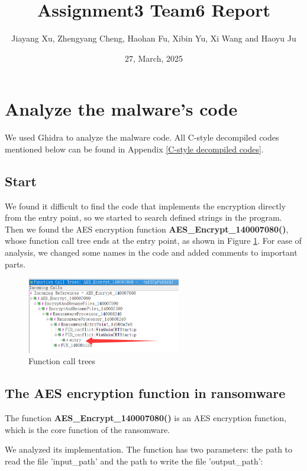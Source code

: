 \documentclass[11pt]{article}
\begin{document}
\title{\textbf{Assignment3 Team6 Report}}
\author{Jiayang Xu, Zhengyang Cheng, Haohan Fu, Xibin Yu, Xi Wang and Haoyu Ju}
\date{27, March, 2025}
\maketitle

\section{Analyze the malware's code}
We used Ghidra to analyze the malware code. All C-style decompiled codes mentioned below can be found in Appendix \ref{C-style decompiled codes}. 

\subsection{Start}
We found it difficult to find the code that implements the encryption directly from the entry point, so we started to search defined strings in the program. Then we found the AES encryption function \textbf{AES\_Encrypt\_140007080()}, whose function call tree ends at the entry point, as shown in Figure \ref{Call Trees}. For ease of analysis, we changed some names in the code and added comments to important parts. 

\begin{figure}[htbp]
    \centering
    \includegraphics[width=0.6\textwidth]{img/Call Trees.png}
    \caption{Function call trees}
    \label{Call Trees}
\end{figure}

\subsection{The AES encryption function in ransomware}
The function \textbf{AES\_Encrypt\_140007080()} is an AES encryption function, which is the core function of the ransomware.

We analyzed its implementation. The function has two parameters: the path to read the file 'input\_path' and the path to write the file 'output\_path':
\end{document}
